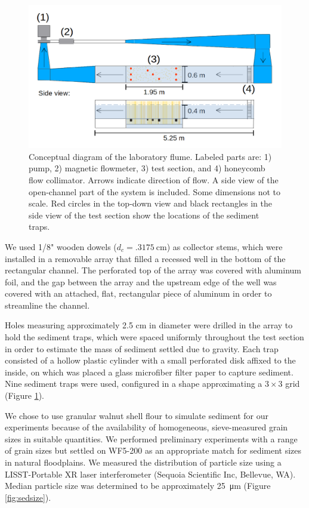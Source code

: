\documentclass{scrreprt}
\begin{document}
\begin{figure}[htbp]
\includegraphics[width=15cm]{../pics/flume_with_sedtraps.png}
\centering
\caption{Conceptual diagram of the laboratory flume. Labeled parts are: 1) pump, 2) magnetic flowmeter, 3) test section, and 4) honeycomb flow collimator. Arrows indicate direction of flow. A side view of the open-channel part of the system is included. Some dimensions not to scale. Red circles in the top-down view and black rectangles in the side view of the test section show the locations of the sediment traps.}
\label{fig:floorplan}
\end{figure}

We used 1/8" wooden dowels ($d_c = \SI{.3175}{\centi\metre}$) as collector stems, which were installed in a removable array that filled a recessed well in the bottom of the rectangular channel. The perforated top of the array was covered with aluminum foil, and the gap between the array and the upstream edge of the well was covered with an attached, flat, rectangular piece of aluminum in order to streamline the channel. 

Holes measuring approximately 2.5 cm in diameter were drilled in the array to hold the sediment traps, which were spaced uniformly throughout the test section in order to estimate the mass of sediment settled due to gravity. Each trap consisted of a hollow plastic cylinder with a small perforated disk affixed to the inside, on which was placed a glass microfiber filter paper to capture sediment. Nine sediment traps were used, configured in a shape approximating a $3 \times 3$ grid (Figure \ref{fig:floorplan}).

We chose to use granular walnut shell flour to simulate sediment for our experiments because of the availability of homogeneous, sieve-measured grain sizes in suitable quantities. We performed preliminary experiments with a range of grain sizes but settled on WF5-200 as an appropriate match for sediment sizes in natural floodplains. We measured the distribution of particle size using a LISST-Portable XR laser interferometer (Sequoia Scientific Inc, Bellevue, WA). Median particle size was determined to be approximately \SI{25}{\micro\metre} (Figure \ref{fig:sedsize}).
\end{document}
